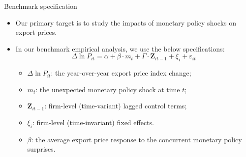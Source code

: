 \documentclass[10pt]{beamer}
\begin{document}
\begin{frame}{Benchmark specification}
    \begin{itemize}
        \item Our primary target is to study the impacts of monetary policy shocks on export prices.
        \item In our benchmark empirical analysis, we use the below specifications:
            \begin{equation}
                \Delta \ln P_{it} = \alpha+\beta \cdot m_{t}+ \Gamma \cdot \textbf{Z}_{it-1}+\xi_{i}+\varepsilon_{it}
            \end{equation}
        \begin{itemize}
            \item $\Delta \ln P_{it}$: the year-over-year export price index change;
            \item $m_t$: the unexpected monetary policy shock at time $t$;
            \item $\textbf{Z}_{it-1}$: firm-level (time-variant) lagged control terms;
            \item $\xi_{i}$: firm-level (time-invariant) fixed effects.
            \item $\beta$: the average export price response to the concurrent monetary policy surprises.
        \end{itemize}
        
    \end{itemize}
\end{frame}
\end{document}
